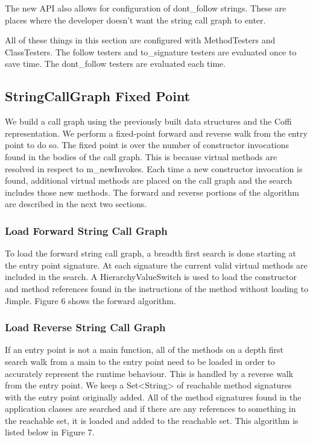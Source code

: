 \documentclass[preprint]{sigplanconf}
\begin{document}
The new API also allows for configuration of dont\_follow strings. These are places where the developer doesn’t want the string call graph to enter.

All of these things in this section are configured with MethodTesters and ClassTesters. The follow testers and to\_signature testers are evaluated once to save time. The dont\_follow testers are evaluated each time.

\subsection{StringCallGraph Fixed Point}
We build a call graph using the previously built data structures and the Coffi representation. We perform a fixed-point forward and reverse walk from the entry point to do so. The fixed point is over the number of constructor invocations found in the bodies of the call graph. This is because virtual methods are resolved in respect to m\_newInvokes. Each time a new constructor invocation is found, additional virtual methods are placed on the call graph and the search includes those new methods. The forward and reverse portions of the algorithm are described in the next two sections.

\subsubsection{Load Forward String Call Graph}
To load the forward string call graph, a breadth first search is done starting at the entry point signature. At each signature the current valid virtual methods are included in the search. A HierarchyValueSwitch is used to load the constructor and method references found in the instructions of the method without loading to Jimple. Figure 6 shows the forward algorithm. 

\subsubsection{Load Reverse String Call Graph}
If an entry point is not a main function, all of the methods on a depth first search walk from a main to the entry point need to be loaded in order to accurately represent the runtime behaviour. This is handled by a reverse walk from the entry point. We keep a Set<String> of reachable method signatures with the entry point originally added. All of the method signatures found in the application classes are searched and if there are any references to something in the reachable set, it is loaded and added to the reachable set. This algorithm is listed below in Figure 7.
\end{document}
